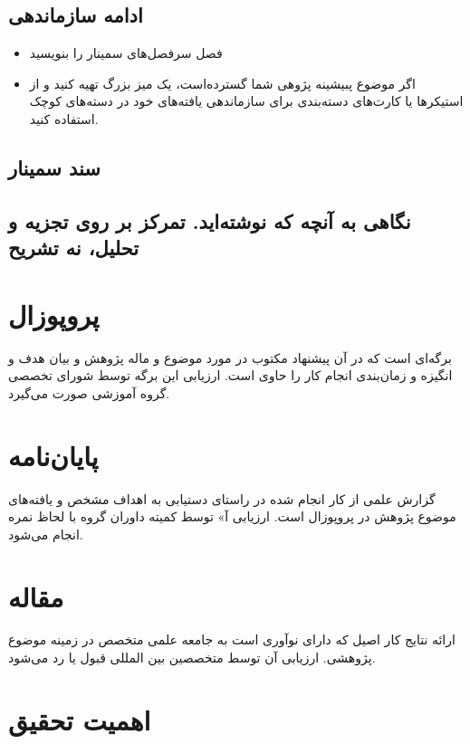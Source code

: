 \documentclass[20pt, a4paper]{article}
\begin{document}
\subsection{ادامه سازماندهی}

\begin{itemize}
    \item فصل سرفصل‌های سمینار را بنویسید
    \item اگر موضوع پبیشینه پژوهی شما گسترده‌است، یک میز بزرگ تهیه کنید و از
    استیکر‌ها یا کارت‌های دسته‌بندی برای سازماندهی یافته‌های خود در دسته‌های
    کوچک استفاده کنید.
\end{itemize}

\subsection{سند سمینار}

\subsection{نگاهی به آنچه که نوشته‌اید. تمرکز بر روی تجزیه و تحلیل، نه تشریح}

\section{پروپوزال}

برگه‌ای است که در آن پیشنهاد مکتوب در مورد موضوع و ماله پژوهش و بیان هدف و
انگیزه و زمان‌بندی انجام کار را حاوی است.  ارزیابی این برگه توسط شورای تخصصی
گروه آموزشی صورت می‌گیرد.

\section{پایان‌نامه}

گزارش علمی از کار انجام شده در راستای دستیابی به اهداف مشخص و یافته‌های موضوع
پژوهش در پروپوزال است. ارزیابی آ» توسط کمیته داوران گروه با لحاظ نمره انجام
می‌شود.

\section*{مقاله}

ارائه نتایج کار اصیل که دارای نوآوری است به جامعه علمی متخصص در زمینه موضوع
پژوهشی. ارزیابی آن توسط متخصصین بین المللی قبول یا رد می‌شود.


\section{اهمیت تحقیق}
\end{document}
